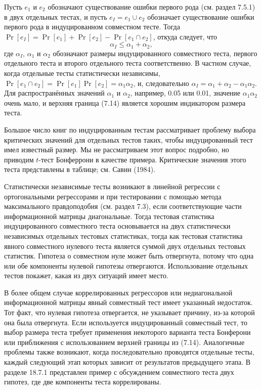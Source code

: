 Пусть $e_1$ и $e_2$ обозначают существование ошибки первого рода (см. раздел 7.5.1) в двух отдельных тестах, и пусть $e_I = e_1 \cup e_2$ обозначает существование ошибки первого рода в индуцированном совместном тесте. Тогда $\Pr[e_I] = \Pr[e_1] + \Pr[e_2] - \Pr[e_1 \cap e_2]$, откуда следует, что
\begin{equation}
\alpha_I \leq \alpha_1 + \alpha_2,
\end{equation}
где $\alpha_I$, $\alpha_1$ и $\alpha_2$ обозначают размеры индуцированного совместного теста, первого отдельного теста и второго отдельного теста соответственно. В частном случае, когда отдельные тесты статистически независимы, $\Pr[e_1 \cap e_2] = \Pr[e_1]\Pr[e_2] = \alpha_1 \alpha_2$, и, следовательно $\alpha_I = \alpha_1 + \alpha_2 -\alpha_1 \alpha_2$. Для распространённых значений $\alpha_1$ и $\alpha_2$, например, 0.05 или 0.01, значение $\alpha_1 \alpha_2$ очень мало, и верхняя граница (7.14) является хорошим индикатором размера теста.

Большое число книг по индуцированным тестам рассматривает проблему выбора критических значений для отдельных тестов таких, чтобы индуцированный тест имел известный размер. Мы не рассматриваем этот вопрос подробно, но приводим $t$-тест Бонферрони в качестве примера. Критические значения этого теста представлены в таблице; см. Савин (1984).

Статистически независимые тесты возникают в линейной регрессии с ортогональными регрессорами и при тестировании с помощью метода максимального правдоподобия (см. раздел 7.3), если соответствующие части информационной матрицы диагональные. Тогда тестовая статистика индуцированного совместного теста основывается на двух статистически независимых отдельных тестовых статистиках, тогда как тестовая статистика явного совместного нулевого теста является суммой двух отдельных тестовых статистик. Гипотеза о совместном нуле может быть отвергнута, потому что одна или обе компоненты нулевой гипотезы отвергаются. Использование отдельных тестов покажет, какая из двух ситуаций имеет место.

В более общем случае коррелированных регрессоров или недиагональной информационной матрицы явный совместный тест имеет указанный недостаток. Тот факт, что нулевая гипотеза отвергается, не указывает причину, из-за которой она была отвергнута. Если используется индуцированный совместный тест, то выбор размера теста требует применения некоторого варианта теста Бонферони или приближения с использованием верхней границы из (7.14). Аналогичные проблемы также возникают, когда последовательно проводятся отдельные тесты, каждый следующий этап которых зависит от результатов предыдущего этапа. В разделе 18.7.1 представлен пример с обсуждением совместного теста двух гипотез, где две компоненты теста коррелированы.

